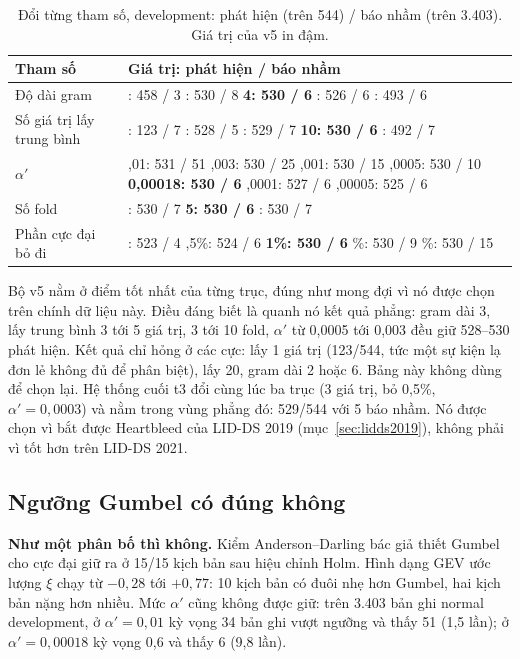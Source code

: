 \begingroup\small
\begin{longtable}[]{@{}>{\raggedright\arraybackslash}p{}>{\raggedright\arraybackslash}p{}@{}}
\caption{Đổi từng tham số, development: phát hiện (trên 544) / báo nhầm (trên 3.403). Giá trị của v5 in đậm.}\label{tab:params-grid}\\
\toprule\noalign{}
Tham số & Giá trị: phát hiện / báo nhầm \\
\midrule\noalign{}
\endhead
\bottomrule\noalign{}
\endlastfoot
Độ dài gram & 2: 458 / 3 \quad 3: 530 / 8 \quad \textbf{4: 530 / 6} \quad 5: 526 / 6 \quad 6: 493 / 6 \\
Số giá trị lấy trung bình & 1: 123 / 7 \quad 3: 528 / 5 \quad 5: 529 / 7 \quad \textbf{10: 530 / 6} \quad 20: 492 / 7 \\
$\alpha'$ & 0,01: 531 / 51 \quad 0,003: 530 / 25 \quad 0,001: 530 / 15 \quad 0,0005: 530 / 10 \quad \textbf{0,00018: 530 / 6} \quad 0,0001: 527 / 6 \quad 0,00005: 525 / 6 \\
Số fold & 3: 530 / 7 \quad \textbf{5: 530 / 6} \quad 10: 530 / 7 \\
Phần cực đại bỏ đi & 0: 523 / 4 \quad 0,5\%: 524 / 6 \quad \textbf{1\%: 530 / 6} \quad 2\%: 530 / 9 \quad 5\%: 530 / 15 \\
\end{longtable}
\endgroup

Bộ v5 nằm ở điểm tốt nhất của từng trục, đúng như mong đợi vì nó được chọn trên chính dữ liệu này. Điều đáng biết là quanh nó kết quả phẳng: gram dài 3, lấy trung bình 3 tới 5 giá trị, 3 tới 10 fold, $\alpha'$ từ 0,0005 tới 0,003 đều giữ 528--530 phát hiện. Kết quả chỉ hỏng ở các cực: lấy 1 giá trị (123/544, tức một sự kiện lạ đơn lẻ không đủ để phân biệt), lấy 20, gram dài 2 hoặc 6. Bảng này không dùng để chọn lại. Hệ thống cuối t3 đổi cùng lúc ba trục (3 giá trị, bỏ 0,5\%, $\alpha' = 0{,}0003$) và nằm trong vùng phẳng đó: 529/544 với 5 báo nhầm. Nó được chọn vì bắt được Heartbleed của LID-DS 2019 (mục~\ref{sec:lidds2019}), không phải vì tốt hơn trên LID-DS 2021.

\subsection{Ngưỡng Gumbel có đúng không}

\textbf{Như một phân bố thì không.} Kiểm Anderson--Darling bác giả thiết Gumbel cho cực đại giữ ra ở 15/15 kịch bản sau hiệu chỉnh Holm. Hình dạng GEV ước lượng $\xi$ chạy từ $-0{,}28$ tới $+0{,}77$: 10 kịch bản có đuôi nhẹ hơn Gumbel, hai kịch bản nặng hơn nhiều. Mức $\alpha'$ cũng không được giữ: trên 3.403 bản ghi normal development, ở $\alpha' = 0{,}01$ kỳ vọng 34 bản ghi vượt ngưỡng và thấy 51 (1,5 lần); ở $\alpha' = 0{,}00018$ kỳ vọng 0,6 và thấy 6 (9,8 lần).

